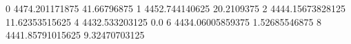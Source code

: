 0 4474.201171875 41.66796875
1 4452.744140625 20.2109375
2 4444.15673828125 11.62353515625
4 4432.533203125 0.0
6 4434.06005859375 1.52685546875
8 4441.85791015625 9.32470703125
